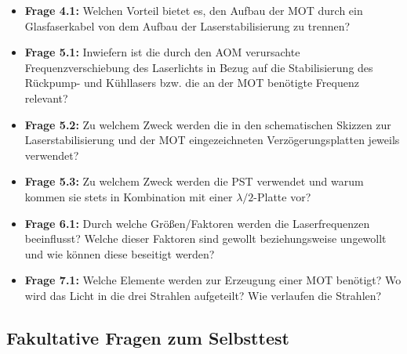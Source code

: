 \documentclass[
class=book,
accentcolor=1b,
custommargins=geometry,
fontsize=11pt,
thesis={type=Versuchsanleitung},
ruledheaders=all,
headline=false,
instbox=false,
marginpar=false,
title=small,
ignore-missing-data=true,
twoside=false,
pdfa=false %
]{apqpub}
\begin{document}
					\begin{itemize}
						\item \textbf{Frage 4.1:} Welchen Vorteil bietet es, den Aufbau der MOT durch ein Glasfaserkabel von dem Aufbau der Laserstabilisierung zu trennen?
						
						\item \textbf{Frage 5.1:} Inwiefern ist die durch den AOM verursachte Frequenzverschiebung des Laserlichts in Bezug auf die Stabilisierung des Rückpump- und Kühllasers bzw. die an der MOT benötigte Frequenz relevant?
						
						\item \textbf{Frage 5.2:} Zu welchem Zweck werden die in den schematischen Skizzen zur Laserstabilisierung und der MOT eingezeichneten Verzögerungsplatten jeweils verwendet?
						
						\item \textbf{Frage 5.3:} Zu welchem Zweck werden die PST verwendet und warum kommen sie stets in Kombination mit einer $\lambda/2$-Platte vor? 
						
						\item \textbf{Frage 6.1:} Durch welche Größen/Faktoren werden die Laserfrequenzen beeinflusst? Welche dieser Faktoren sind gewollt beziehungsweise ungewollt und wie können diese beseitigt werden?
						
						\item \textbf{Frage 7.1:} Welche Elemente werden zur Erzeugung einer MOT benötigt? Wo wird das Licht in die drei Strahlen aufgeteilt? Wie verlaufen die Strahlen?
					\end{itemize}
					
					\subsection{Fakultative Fragen zum Selbsttest}
					
\end{document}

